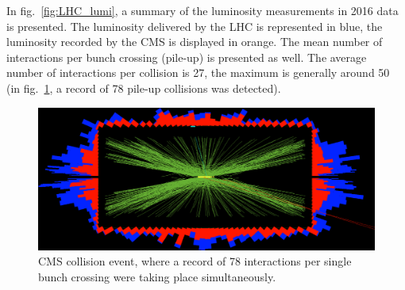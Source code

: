 \noindent In fig.~\ref{fig:LHC_lumi}, a summary of the luminosity measurements in 2016 data is presented. The luminosity delivered by the LHC is represented in blue, the luminosity recorded by the CMS is displayed in orange. The mean number of interactions per bunch crossing (pile-up) is presented as well. The average number of interactions per collision is 27, the maximum is generally around 50 (in fig.~\ref{fig:pp_pileup}, a record of 78 pile-up collisions was detected).

\begin{figure}[!htb]
  \centering
    \includegraphics[width=.5\textwidth]{figures/78events_PU_b.png}
  \caption{CMS collision event, where a record of 78 interactions per single bunch crossing were taking place simultaneously.}
  \label{fig:pp_pileup}
\end{figure}

